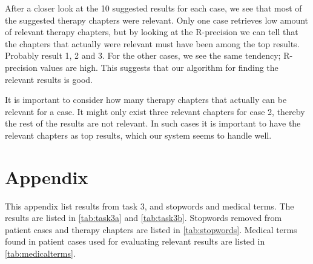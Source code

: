 \documentclass[a4paper, 11pt]{article}
\begin{document}
After a closer look at the 10 suggested results for each case, we see that most of the suggested therapy chapters were relevant. Only one case retrieves low amount of relevant therapy chapters, but by looking at the R-precision we can tell that the chapters that actually were relevant must have been among the top results. Probably result 1, 2 and 3. For the other cases, we see the same tendency; R-precision values are high. This suggests that our algorithm for finding the relevant results is good.

It is important to consider how many therapy chapters that actually can be relevant for a case. It might only exist three relevant chapters for case 2, thereby the rest of the results are not relevant. In such cases it is important to have the relevant chapters as top results, which our system seems to handle well. 


\appendix
\section{Appendix}
\label{appendix}
This appendix list results from task 3, and stopwords and medical terms.
The results are listed in \autoref{tab:task3a} and \autoref{tab:task3b}.
Stopwords removed from patient cases and therapy chapters are listed in
\autoref{tab:stopwords}.
Medical terms found in patient cases used for evaluating relevant results are
listed in \autoref{tab:medicalterms}.
\end{document}

